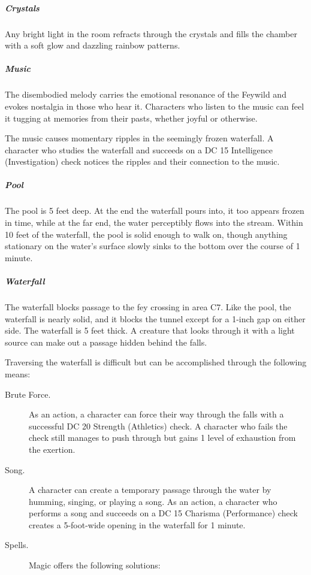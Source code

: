 \documentclass[10pt,a4paper,twoside,bg=print,twocolumn,openany,nodeprecatedcode]{dndbook}
\begin{document}
\subparagraph{Crystals}
Any bright light in the room refracts through the crystals and fills the chamber with a soft glow and dazzling rainbow patterns.

\subparagraph{Music}
The disembodied melody carries the emotional resonance of the Feywild and evokes nostalgia in those who hear it. Characters who listen to the music can feel it tugging at memories from their pasts, whether joyful or otherwise.

The music causes momentary ripples in the seemingly frozen waterfall. A character who studies the waterfall and succeeds on a DC 15 Intelligence (Investigation) check notices the ripples and their connection to the music.

\subparagraph{Pool}
The pool is 5 feet deep. At the end the waterfall pours into, it too appears frozen in time, while at the far end, the water perceptibly flows into the stream. Within 10 feet of the waterfall, the pool is solid enough to walk on, though anything stationary on the water's surface slowly sinks to the bottom over the course of 1 minute.

\subparagraph{Waterfall}
The waterfall blocks passage to the fey crossing in area C7. Like the pool, the waterfall is nearly solid, and it blocks the tunnel except for a 1-inch gap on either side. The waterfall is 5 feet thick. A creature that looks through it with a light source can make out a passage hidden behind the falls.

Traversing the waterfall is difficult but can be accomplished through the following means:


\begin{description}
\item[Brute Force.]
As an action, a character can force their way through the falls with a successful DC 20 Strength (Athletics) check. A character who fails the check still manages to push through but gains 1 level of exhaustion from the exertion.
\item[Song.]
A character can create a temporary passage through the water by humming, singing, or playing a song. As an action, a character who performs a song and succeeds on a DC 15 Charisma (Performance) check creates a 5-foot-wide opening in the waterfall for 1 minute.
\item[Spells.]
Magic offers the following solutions:
\end{description}
\end{document}
